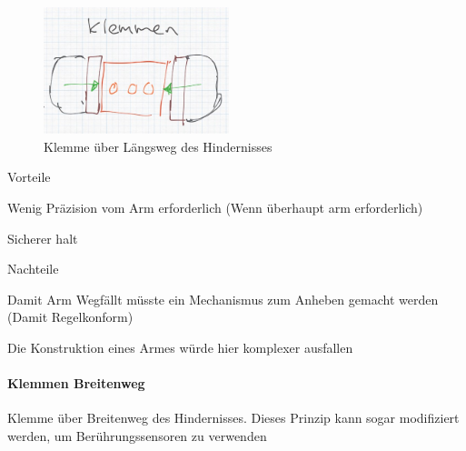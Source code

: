 \documentclass[../main.tex]{subfiles}
\begin{document}
\begin{figure}[h!]
        \centering
        \includegraphics[width=0.48\textwidth]{img/technologierecherche/Aufnahme/Laengsweg_Griff.jpg}
        \caption{Klemme über Längsweg des Hindernisses}
        \label{img:tech_Laengsweg_Griff}
\end{figure}

\begin{minipage}[t]{0.48\textwidth}
    \begin{items}
          \item [Vorteile]
          \item Wenig Präzision vom Arm erforderlich (Wenn überhaupt arm erforderlich)
          \item Sicherer halt
    \end{items}
\end{minipage}
\hfill
\begin{minipage}[t]{0.48\textwidth}
    \begin{items}
          \item [Nachteile]
          \item Damit Arm Wegfällt müsste ein Mechanismus zum Anheben gemacht werden (Damit Regelkonform)
          \item Die Konstruktion eines Armes würde hier komplexer ausfallen 
    \end{items}
\end{minipage}
\newpage
\paragraph{Klemmen Breitenweg}
Klemme über Breitenweg des Hindernisses. Dieses Prinzip kann sogar modifiziert
werden, um Berührungssensoren zu verwenden
\end{document}
